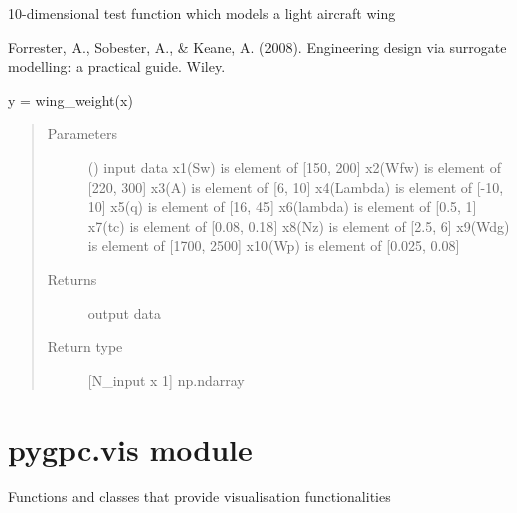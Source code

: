 \documentclass[letterpaper,10pt,english,openany,oneside]{sphinxmanual}
\begin{document}
\begin{fulllineitems}
\label{\detokenize{pygpc:pygpc.testfun.wing_weight}}
10-dimensional test function which models a light aircraft wing

Forrester, A., Sobester, A., \& Keane, A. (2008). Engineering design via
surrogate modelling: a practical guide. Wiley.

y  = wing\_weight(x)
\begin{quote}\begin{description}
\item[{Parameters}] \leavevmode
{} (\sphinxstyleliteralemphasis{\sphinxupquote{{[}}}\sphinxstyleliteralemphasis{\sphinxupquote{{]} }}) \textendash{} input data
x1(Sw)  is element of {[}150, 200{]}
x2(Wfw) is element of {[}220, 300{]}
x3(A)   is element of {[}6, 10{]}
x4(Lambda)   is element of {[}-10, 10{]}
x5(q)   is element of {[}16, 45{]}
x6(lambda)   is element of {[}0.5, 1{]}
x7(tc)  is element of {[}0.08, 0.18{]}
x8(Nz)  is element of {[}2.5, 6{]}
x9(Wdg) is element of {[}1700, 2500{]}
x10(Wp) is element of {[}0.025, 0.08{]}

\item[{Returns}] \leavevmode
{} \textendash{} output data

\item[{Return type}] \leavevmode
{[}N\_input x 1{]} np.ndarray

\end{description}\end{quote}

\end{fulllineitems}



\section{pygpc.vis module}
\label{\detokenize{pygpc:module-pygpc.vis}}\label{\detokenize{pygpc:pygpc-vis-module}}
Functions and classes that provide visualisation functionalities
\end{document}
